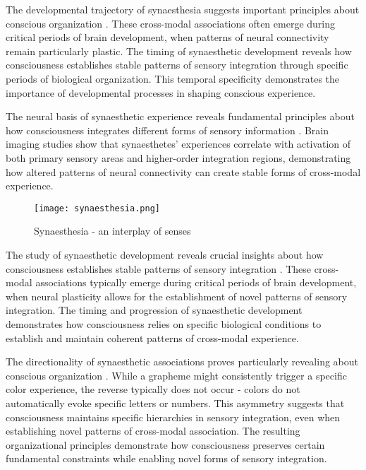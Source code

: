 The developmental trajectory of synaesthesia suggests important principles about conscious organization \cite{Simner2012}. These cross-modal associations often emerge during critical periods of brain development, when patterns of neural connectivity remain particularly plastic. The timing of synaesthetic development reveals how consciousness establishes stable patterns of sensory integration through specific periods of biological organization. This temporal specificity demonstrates the importance of developmental processes in shaping conscious experience.

The neural basis of synaesthetic experience reveals fundamental principles about how consciousness integrates different forms of sensory information \cite{Nunn2002}. Brain imaging studies show that synaesthetes' experiences correlate with activation of both primary sensory areas and higher-order integration regions, demonstrating how altered patterns of neural connectivity can create stable forms of cross-modal experience.

\begin{figure}[h]
    \centering
    \texttt{[image: synaesthesia.png]}

    \caption{Synaesthesia - an interplay of senses}
\end{figure}

The study of synaesthetic development reveals crucial insights about how consciousness establishes stable patterns of sensory integration \cite{Barnett2008}. These cross-modal associations typically emerge during critical periods of brain development, when neural plasticity allows for the establishment of novel patterns of sensory integration. The timing and progression of synaesthetic development demonstrates how consciousness relies on specific biological conditions to establish and maintain coherent patterns of cross-modal experience.

The directionality of synaesthetic associations proves particularly revealing about conscious organization \cite{Eagleman2009}. While a grapheme might consistently trigger a specific color experience, the reverse typically does not occur - colors do not automatically evoke specific letters or numbers. This asymmetry suggests that consciousness maintains specific hierarchies in sensory integration, even when establishing novel patterns of cross-modal association. The resulting organizational principles demonstrate how consciousness preserves certain fundamental constraints while enabling novel forms of sensory integration.

